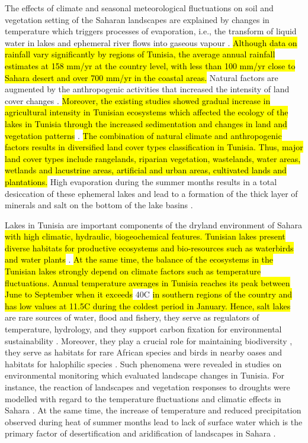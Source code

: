 \documentclass[land,article,submit,pdftex,moreauthors]{Definitions/mdpi}
\begin{document}
The effects of climate and seasonal meteorological fluctuations on soil and vegetation setting of the Saharan landscapes are explained by changes in temperature which triggers processes of evaporation, i.e., the transform of liquid water in lakes and ephemeral river flows into gaseous vapour \cite{HAMMI2003215}. \hl{Although data on rainfall vary significantly by regions of Tunisia, the average annual rainfall estimates at 158 mm/yr at the country level, with less than 100 mm/yr close to Sahara desert and over 700 mm/yr in the coastal areas. }Natural factors are augmented by the anthropogenic activities that increased the intensity of land cover changes \cite{RODRIGUEZCABALLERO2017146}. \hl{Moreover, the existing studies showed gradual increase in agricultural intensity in Tunisian ecosystems which affected the ecology of the lakes in Tunisia through the increased sedimentation and changes in land and vegetation patterns} \cite{STEVENSON1991275}. \hl{The combination of natural climate and anthropogenic factors results in diversified land cover types classification in Tunisia. Thus, major land cover types include rangelands, riparian vegetation, wastelands, water areas, wetlands and lacustrine areas, artificial and urban areas, cultivated lands and plantations. }High evaporation during the summer months results in a total desiccation of these ephemeral lakes and lead to a formation of the thick layer of minerals and salt on the bottom of the lake basins \cite{BRYANT1994269}. 

Lakes in Tunisia are important components of the dryland environment of Sahara\hl{ with high climatic, hydraulic, biogeochemical features. Tunisian lakes present diverse habitats for productive ecosystems and bio-resources such as waterbirds and water plants} \cite{SAHBANI2022102288}. \hl{At the same time, the balance of the ecosystems in the Tunisian lakes strongly depend on climate factors such as  temperature fluctuations. Annual temperature averages in Tunisia reaches its peak between June to September when it exceeds} 40\degree C\hl{ in southern regions of the country and has low values at 11.5}\degree \hl{C during the coldest period in January. Hence, salt lakes} are rare sources of water, flood and fishery, they serve as regulators of temperature, hydrology, and they support carbon fixation for environmental sustainability \cite{NIGAM2020201}. Moreover, they play a crucial role for maintaining biodiversity \cite{Neji}, they serve as habitats for rare African species and birds in nearby oases \cite{Baduel,RADDADI2022104806,Kamel} and habitats for halophilic species \cite{NEIFAR20191802}. Such phenomena were revealed in studies on environmental monitoring which evaluated landscape changes in Tunisia. For instance, the reaction of landscapes and vegetation responses to droughts were modelled with regard to the temperature fluctuations and climatic effects in Sahara \cite{HANAFI2008557,PAUSATA2020235,Lemenkova202313}. At the same time, the increase of temperature and reduced precipitation observed during heat of summer months lead to lack of surface water which is the primary factor of desertification and aridification of landscapes in Sahara \cite{OSWALD2023369,DODORICO2013326}. 
\end{document}
